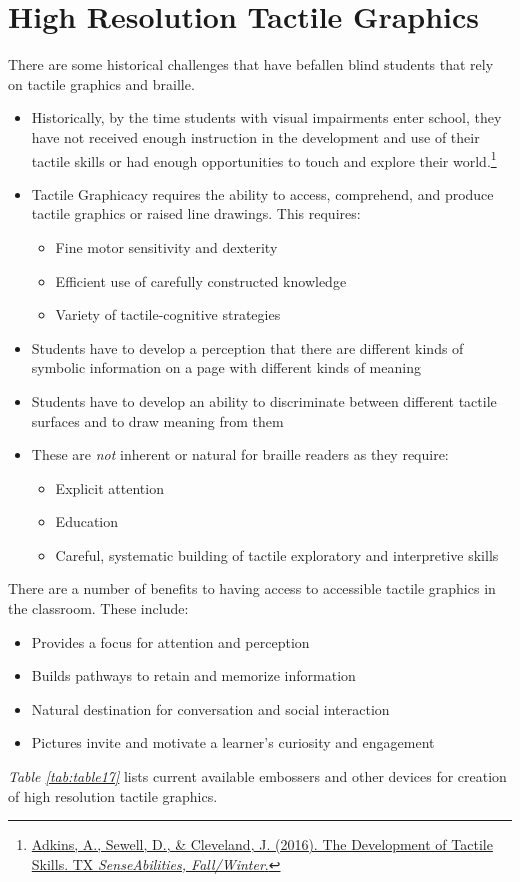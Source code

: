 \section{High Resolution Tactile Graphics}\label{tactile-graphics-high-resolution-complex-graphics}
There are some historical challenges that have befallen blind students that rely on tactile graphics and braille.
\begin{itemize}
 \item Historically, by the time students with visual impairments enter school, they have not received enough instruction in the development and use of their tactile skills or had enough opportunities to touch and explore their world.\footnote{\href{http://www.tsbvi.edu/tx-senseabilities/issues/fall-winter-2016/the-development-of-tactile-skills}{Adkins, A., Sewell, D., \& Cleveland, J. (2016). The Development of Tactile Skills. TX \emph{SenseAbilities, Fall/Winter}.}}
 \item Tactile Graphicacy requires the ability to access, comprehend, and produce tactile graphics or raised line drawings. This requires:
   \begin{itemize}
     \item Fine motor sensitivity and dexterity
     \item Efficient use of carefully constructed knowledge
     \item Variety of tactile-cognitive strategies
   \end{itemize}
 \item Students have to develop a perception that there are different kinds of symbolic information on a page with different kinds of meaning
 \item Students have to develop an ability to discriminate between different tactile surfaces and to draw meaning from them
 \item These are \emph{not} inherent or natural for braille readers as they require:
   \begin{itemize}
     \item Explicit attention
     \item Education
     \item Careful, systematic building of tactile exploratory and interpretive skills
   \end{itemize}
\end{itemize}

There are a number of benefits to having access to accessible tactile graphics in the classroom. These include:
\begin{itemize}
 \item Provides a focus for attention and perception
 \item Builds pathways to retain and memorize information
 \item Natural destination for conversation and social interaction
 \item Pictures invite and motivate a learner's curiosity and engagement
\end{itemize}
\emph{Table \ref{tab:table17}} lists current available embossers and other devices for creation of high resolution tactile graphics.

